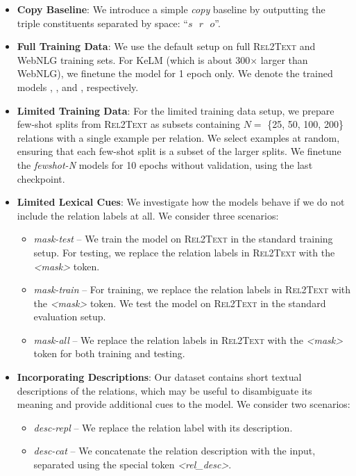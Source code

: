 \begin{itemize}
    \item \textbf{Copy Baseline}: We introduce a simple \textit{copy} baseline by outputting the triple constituents separated by space: ``$s\text{ }r\text{ }o$''.



    \item \textbf{Full Training Data}: We use the default setup on full \textsc{Rel2Text} and WebNLG training sets. For KeLM (which is about 300$\times$ larger than WebNLG), we finetune the model for 1 epoch only. We denote the trained models \BARTr{}, \BARTw{}, and \BARTk{}, respectively.

    \item \textbf{Limited Training Data}: For the limited training data setup, we prepare few-shot splits from \textsc{Rel2Text} as subsets containing $N=$ \{25, 50, 100, 200\} relations with a single example per relation. We select examples at random, ensuring that each few-shot split is a subset of the larger splits. We finetune the \textit{fewshot-N} models for 10 epochs without validation, using the last checkpoint.

    \item \textbf{Limited Lexical Cues}: We investigate how the models behave if we do not include the relation labels at all. We consider three scenarios:
          \begin{itemize}
              \item \textit{mask-test} -- We train the model on \textsc{Rel2Text} in the standard training setup. For testing, we replace the relation labels in  \textsc{Rel2Text} with the \textit{<mask>} token.
              \item \textit{mask-train} -- For training, we replace the relation labels in  \textsc{Rel2Text} with the \textit{<mask>} token. We test the model on \textsc{Rel2Text} in the standard evaluation setup.
              \item \textit{mask-all} -- We replace the relation labels in  \textsc{Rel2Text} with the \textit{<mask>} token for both training and testing.
          \end{itemize}


    \item \textbf{Incorporating Descriptions}: Our dataset contains short textual descriptions of the relations, which may be useful to disambiguate its meaning and provide additional cues to the model. We consider two scenarios:
          \begin{itemize}
              \item \textit{desc-repl} -- We replace the relation label with its description.
              \item \textit{desc-cat} -- We concatenate the relation description with the input, separated using the special token \textit{<rel\_desc>}.
          \end{itemize}
\end{itemize}

